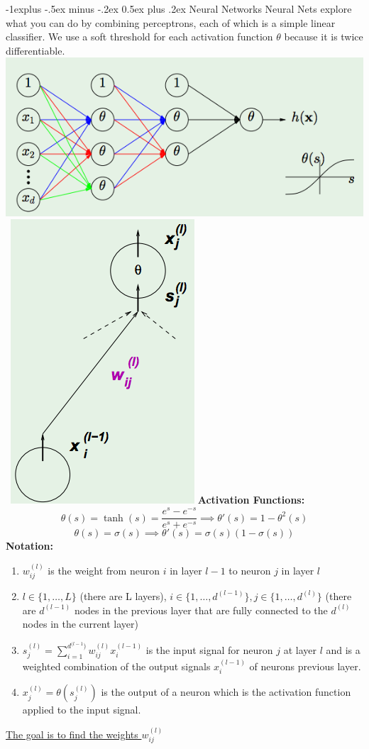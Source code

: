 \documentclass[3pt,landscape]{article}
\makeatletter
\renewcommand{\subsection}{\@startsection{subsection}{2}{0mm}%
                            {-1explus -.5ex minus -.2ex}%
                            {0.5ex plus .2ex}%
                            {\normalfont\normalsize\bfseries}}
\makeatother
\begin{document}
\begin{multicols}{3}
\subsection{Neural Networks}
Neural Nets explore what you can do by combining perceptrons, each of which is a simple linear classifier. We use a soft threshold for each activation function $\theta$ because it is twice differentiable.
\includegraphics[scale=0.31]{NN.pdf} \ \includegraphics[scale=0.2]{NN2.pdf}
{\bf Activation Functions:}
\[\theta(s) = \operatorname{tanh}(s) = \frac{e^s-e^{-s}}{e^s+e^{-s}} \implies \theta'(s) = 1 - \theta^2(s)\]
\[\theta(s) = \sigma(s) \implies \theta'(s) = \sigma(s)(1-\sigma(s))\]
{\bf Notation:}
\begin{enumerate}
\item $w_{ij}^{(l)}$ is the weight from neuron $i$ in layer $l-1$ to neuron $j$ in layer $l$
\item $l \in \{1,\ldots,L\}$ (there are L layers), $i \in \{1,\ldots,d^{(l-1)}\}, j \in \{1,\ldots,d^{(l)}\}$ (there are $d^{(l-1)}$ nodes in the previous layer that are fully connected to the $d^{(l)}$ nodes in the current layer)
\item \(s_j^{(l)} = \sum_{i=1}^{d^{(l-1})} w_{ij}^{(l)} x_i^{(l-1)}\) is the input signal for neuron $j$ at layer $l$ and is a weighted combination of the output signals $x_i^{(l-1)}$ of neurons previous layer.
\item \(x_j^{(l)} = \theta(s_j^{(l)})\) is the output of a neuron which is the activation function applied to the input signal.
\end{enumerate}
\underline{The goal is to find the weights $w_{ij}^{(l)}$}



\end{multicols}
\end{document}
